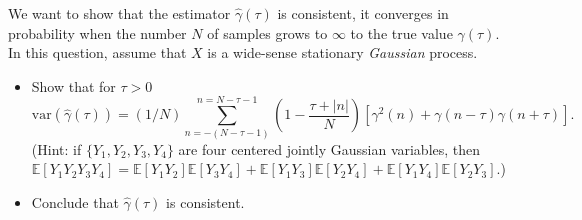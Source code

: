 \documentclass[11pt]{article}
\begin{document}
\begin{exercise}
    We want to show that the estimator $\hat{\gamma}(\tau)$ is consistent, \ie it converges in probability when the number $N$ of samples grows to $\infty$ to the true value ${\gamma}(\tau)$.
    In this question, assume that $X$ is a wide-sense stationary \textit{Gaussian} process.
    \begin{itemize}
        \item Show that for $\tau>0$ 
    \begin{equation}
       \text{var}(\hat{\gamma}(\tau)) = (1/N) \sum_{n=-(N-\tau-1)}^{n=N-\tau-1} \left(1 - \frac{\tau + |n|}{N}\right) \left[\gamma^2(n) + \gamma(n-\tau)\gamma(n+\tau)\right].
    \end{equation}
    (Hint: if $\{Y_1, Y_2, Y_3, Y_4\}$ are four centered jointly Gaussian variables, then $\mathbb{E}[Y_1 Y_2 Y_3 Y_4] = \mathbb{E}[Y_1 Y_2]\mathbb{E}[Y_3 Y_4] + \mathbb{E}[Y_1 Y_3]\mathbb{E}[Y_2 Y_4] + \mathbb{E}[Y_1 Y_4]\mathbb{E}[Y_2 Y_3]$.) 
    \item Conclude that $\hat{\gamma}(\tau)$ is consistent.
    \end{itemize}
\end{exercise}
\end{document}
